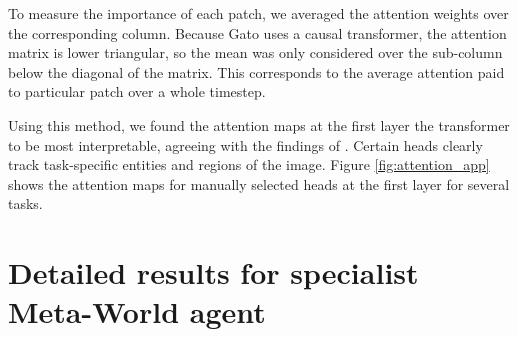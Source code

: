 \documentclass[10pt]{article} \usepackage[accepted]{tmlr}
\newcommand{\metaworld}{{Meta-World}}
\begin{document}
To measure the importance of each patch, we averaged the attention weights over the corresponding column. Because Gato uses a causal transformer, the attention matrix is lower triangular, so the mean was only considered over the sub-column below the diagonal of the matrix.
This corresponds to the average attention paid to particular patch over a whole timestep.

Using this method, we found the attention maps at the first layer the transformer to be most interpretable, agreeing with the findings of \citet{abnar2020quantifying}. Certain heads clearly track task-specific entities and regions of the image. Figure \ref{fig:attention_app} shows the attention maps for manually selected heads at the first layer for several tasks.


\clearpage
\section{Detailed results for specialist \metaworld{} agent}\label{sec:mt50_results}
\end{document}
